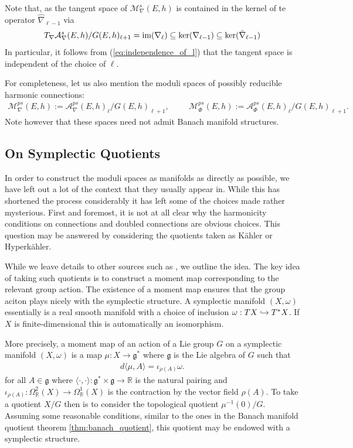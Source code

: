 \documentclass[12pt]{ociamthesis}  %
\begin{document}
Note that, as the tangent space of $\mathcal M^s_\nabla(E,h)$ is
contained in the kernel of te operator $\hat\nabla_{\ell-1}$ via
\begin{align*}
  T_\nabla \mathcal A^s_\nabla(E,h)/G(E,h)_{\ell+1}
  = \operatorname{im}(\nabla_\ell) \subseteq \ker(\nabla_{\ell-1})
  \subseteq \ker(\hat\nabla_{\ell-1})
\end{align*}
In particular, it follows from (\ref{eq:independence_of_l}) that
the tangent space is independent of the choice of $\ell$.

For completeness, let us also mention the moduli spaces of
possibly reducible harmonic connections:
\begin{align*}
  \mathcal M^{ps}_\nabla(E,h) := \mathcal A^{ps}_\nabla(E,h)_\ell/G(E,h)_{\ell + 1}, \hspace{1cm}
  \mathcal M^{ps}_\Phi(E,h) := \mathcal A^{ps}_\Phi(E,h)_\ell/G(E,h)_{\ell + 1}.
\end{align*}
Note however that these spaces need not admit Banach manifold structures.

\subsection{On Symplectic Quotients}\label{sec:symplectic_quotients}

In order to construct the moduli spaces as manifolds as directly as
possible, we have left out a lot of the context that they usually appear
in. While this has shortened the process considerably it has left
some of the choices made rather mysterious. First and foremost, it is
not at all clear why the harmonicity conditions on connections and
doubled connections are obvious choices. This question may be
answered by considering the quotients taken as K\"ahler or Hyperk\"ahler.

While we leave details to other sources such as \missingcitation,
we outline the idea. The key idea of taking such quotients is to
construct a moment map corresponding to the relevant group action.
The existence of a moment map ensures that the group aciton plays nicely
with the symplectic structure. A symplectic manifold $(X,\omega)$
essentially is a real smooth manifold with a choice of inclusion
$\omega : TX \hookrightarrow T^*X$. If $X$ is finite-dimensional this is
automatically an isomorphism.

More precisely, a moment map of an action of a Lie group $G$ on a symplectic manifold
$(X,\omega)$ is a map $\mu : X \to \mathfrak g^*$
where $\mathfrak g$ is the Lie algebra of $G$ such that 
\begin{align*}
  d\langle\mu,A\rangle = \iota_{\rho(A)}\omega.
\end{align*}
for all $A\in\mathfrak g$ where $\langle \cdot,\cdot\rangle : \mathfrak g^* \times \mathfrak g \to \mathbb R$
is the natural pairing and $\iota_{\rho(A)} : \Omega^2_{\mathbb R}(X)\to \Omega^1_{\mathbb R}(X)$
is the contraction by the vector field $\rho(A)$. To take a
quotient $X/G$ then is to consider the topological quotient $\mu^{-1}(0)/G$.
Assuming some reasonable conditions, similar to the ones 
in the Banach manifold quotient theorem \ref{thm:banach_quotient},
this quotient may be endowed with a symplectic structure.
\end{document}
